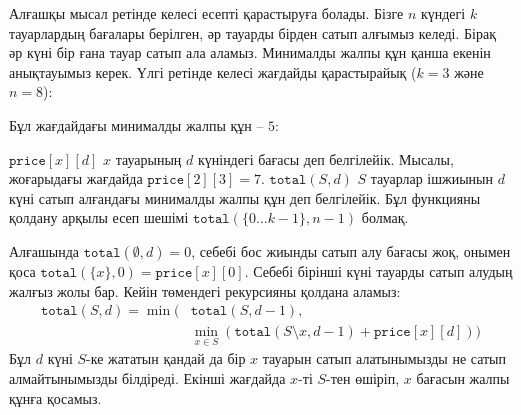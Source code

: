 Алғашқы мысал ретінде келесі есепті қарастыруға болады. 
Бізге $n$ күндегі $k$ тауарлардың бағалары берілген, әр тауарды бірден сатып алғымыз келеді. Бірақ әр күні бір ғана тауар
сатып ала аламыз. Минималды жалпы құн қанша екенін анықтауымыз керек. Үлгі ретінде келесі
жағдайды қарастырайық ($k=3$ және $n=8$):
\begin{center}
\end{center}
Бұл жағдайдағы минималды жалпы құн -- $5$:
\begin{center}
\end{center}

$\texttt{price}[x][d]$ $x$ тауарының $d$ күніндегі бағасы деп белгілейік.
Мысалы, жоғарыдағы жағдайда $\texttt{price}[2][3] = 7$.
$\texttt{total}(S,d)$ $S$ тауарлар ішжиынын $d$ күні сатып алғандағы 
минималды жалпы құн деп белгілейік. Бұл функцияны қолдану арқылы есеп шешімі 
$\texttt{total}(\{0 \ldots k-1\},n-1)$ болмақ.

Алғашында $\texttt{total}(\emptyset,d) = 0$, себебі 
бос жиынды сатып алу бағасы жоқ, онымен қоса 
$\texttt{total}(\{x\},0) = \texttt{price}[x][0]$.
Себебі бірінші күні тауарды сатып алудың жалғыз жолы бар.
Кейін төмендегі рекурсияны қолдана аламыз:
\begin{equation*}
\begin{split}
\texttt{total}(S,d) = \min( & \texttt{total}(S,d-1), \\
& \min_{x \in S} (\texttt{total}(S \setminus x,d-1)+\texttt{price}[x][d]))
\end{split}
\end{equation*}
Бұл $d$ күні $S$-ке жататын қандай да бір $x$ тауарын сатып алатынымызды не сатып алмайтынымызды білдіреді. Екінші жағдайда $x$-ті $S$-тен өшіріп, $x$ бағасын 
жалпы құнға қосамыз.


